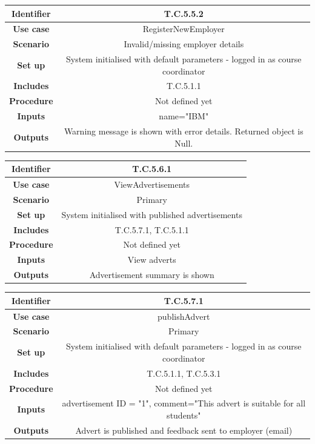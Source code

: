 \documentclass{l3deliverable}
\begin{document}
\begin{tabular}{|c|c|}
\hline \textbf{Identifier} & T.C.5.5.2\\
\hline \textbf{Use case} & RegisterNewEmployer\\
\hline \textbf{Scenario} & Invalid/missing employer details\\
\hline \textbf{Set up} & System initialised with default parameters - logged in as course coordinator\\
\hline \textbf{Includes} & T.C.5.1.1\\
\hline \textbf{Procedure} & Not defined yet\\
\hline \textbf{Inputs} & name="IBM"\\
\hline \textbf{Outputs} & Warning message is shown with error details. Returned object is Null.\\
\hline
\end{tabular}

\begin{tabular}{|c|c|}
\hline \textbf{Identifier} & T.C.5.6.1\\
\hline \textbf{Use case} & ViewAdvertisements\\
\hline \textbf{Scenario} & Primary\\
\hline \textbf{Set up} & System initialised with published advertisements\\
\hline \textbf{Includes} & T.C.5.7.1, T.C.5.1.1\\
\hline \textbf{Procedure} & Not defined yet\\
\hline \textbf{Inputs} & View adverts\\
\hline \textbf{Outputs} & Advertisement summary is shown\\
\hline
\end{tabular}

\begin{tabular}{|c|c|}
\hline \textbf{Identifier} & T.C.5.7.1\\
\hline \textbf{Use case} & publishAdvert\\
\hline \textbf{Scenario} & Primary\\
\hline \textbf{Set up} & System initialised with default parameters - logged in as course coordinator\\
\hline \textbf{Includes} & T.C.5.1.1, T.C.5.3.1\\
\hline \textbf{Procedure} & Not defined yet\\
\hline \textbf{Inputs} & advertisement ID = "1", comment="This advert is suitable for all students"\\
\hline \textbf{Outputs} & Advert is published and feedback sent to employer (email)\\
\hline
\end{tabular}
\end{document}
